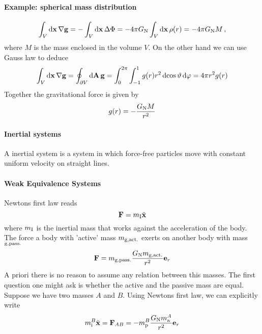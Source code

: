 \paragraph{Example: spherical mass distribution}
\begin{equation}
    \int_V\dif{\vec{x}}\, \nabla\vec{g}=-\int_V\dif{\vec{x}}\, \Delta\Phi = -4\pi G\textsubscript{N}\int_V\dif{\vec{x}}\,\rho(r)= -4\pi G\textsubscript{N} M\, ,
\end{equation}
where $M$ is the mass enclosed in the volume $V$. On the other hand we can use Gauss law to deduce
\begin{equation}
    \int_V\dif{\vec{x}}\, \nabla\vec{g}=\oint_{\partial V}\dif{\vec{A}}\, \vec{g} =\int_{0}^{2\pi}\int_{-1}^{1} g(r)r^2\dif{\cos\vartheta}\dif{\varphi}=4\pi r^2g(r)
\end{equation}
Together the gravitational force is given by
\begin{equation}
    g(r)=-\frac{G\textsubscript{N}M}{r^2}
\end{equation}
\paragraph{Inertial systems}
A inertial system is a system in which force-free particles move with constant uniform velocity on straight lines.
\paragraph{Weak Equivalence Systems}
Newtons first law reads
\begin{equation}
    \vec{F}=m\textsubscript{I}\ddot{\vec{x}}
\end{equation}
where $m\textsubscript{I}$ is the inertial mass that works against the acceleration of the body.
The force a body with 'active' mass $m\textsubscript{g,act.}$ exerts on another body with mass $\textsubscript{g,pass.}$
\begin{equation}
    \vec{F}=m\textsubscript{g,pass.}\frac{G\textsubscript{N}m\textsubscript{g,act.}}{r^2}\vec{e}_r
\end{equation}
A priori there is no reason to assume any relation between this masses. The first question one might ask is whether the active and the passive mass are equal. Suppose we have two masses $A$ and $B$. Using Newtons first law, we can explicitly write
\begin{equation}
    m^{B}_{\text{i}}\ddot{\vec{x}}=\vec{F}_{AB}=-	m^{B}_{\text{p}}\frac{G\textsubscript{N}m^{A}_{\text{a}}}{r^2}\vec{e}_r
\end{equation}
